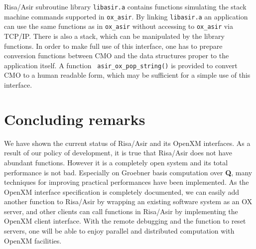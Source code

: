 \documentclass[runningheads]{cl2emult}
\begin{document}
Risa/Asir subroutine library {\tt libasir.a} contains functions
simulating the stack machine commands supported in {\tt ox\_asir}.  By
linking {\tt libasir.a} an application can use the same functions as
in {\tt ox\_asir} without accessing to {\tt ox\_asir} via
TCP/IP. There is also a stack, which can be manipulated by the library
functions. In order to make full use of this interface, one has to
prepare conversion functions between CMO and the data structures
proper to the application itself.  A function {\tt
asir\_ox\_pop\_string()} is provided to convert CMO to a human
readable form, which may be sufficient for a simple use of this
interface.

\section{Concluding remarks}
We have shown the current status of Risa/Asir and its OpenXM
interfaces. As a result of our policy of development, it is true that
Risa/Asir does not have abundant functions. However it is a completely
open system and its total performance is not bad. Especially on
Groebner basis computation over {\bf Q}, many techniques for improving
practical performances have been implemented. As the OpenXM interface
specification is completely documented, we can easily add another
function to Risa/Asir by wrapping an existing software system as an OX
server, and other clients can call functions in Risa/Asir by
implementing the OpenXM client interface.  With the remote debugging
and the function to reset servers, one will be able to enjoy parallel
and distributed computation with OpenXM facilities.
%
\end{document}
